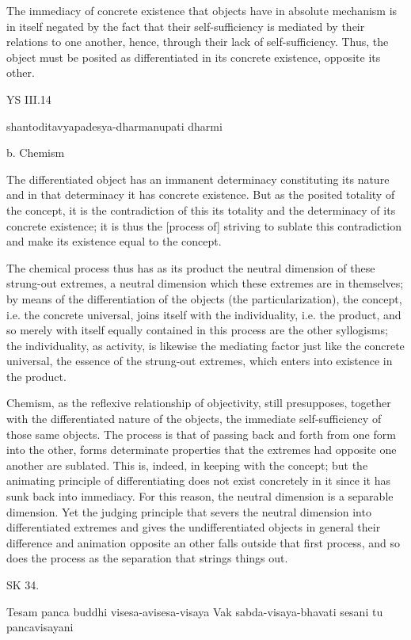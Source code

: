 The immediacy of concrete existence that objects have in absolute mechanism
is in itself negated by the fact that their self-sufficiency is mediated by
their relations to one another, hence, through their lack of self-sufficiency.
Thus, the object must be posited as differentiated in its concrete existence,
opposite its other.

YS III.14

shantoditavyapadesya-dharmanupati dharmi

b. Chemism

The differentiated object has an immanent determinacy constituting
its nature and in that determinacy it has concrete existence.
But as the posited totality of the concept, it is the contradiction of
this its totality and the determinacy of its concrete existence;
it is thus the [process of] striving to sublate this contradiction
and make its existence equal to the concept.

The chemical process thus has as its product the neutral dimension of
these strung-out extremes, a neutral dimension which these extremes are
in themselves; by means of the differentiation of the objects (the particularization),
the concept, i.e. the concrete universal, joins itself
with the individuality, i.e. the product, and so merely
with itself equally contained in this process are the other syllogisms;
the individuality, as activity, is likewise the mediating factor just like the concrete universal,
the essence of the strung-out extremes, which enters into existence in the product.

Chemism, as the reflexive relationship of objectivity, still presupposes,
together with the differentiated nature of the objects,
the immediate self-sufficiency of those same objects.
The process is that of passing back and forth from one form into the other,
forms determinate properties that the extremes had opposite one another are sublated.
This is, indeed, in keeping with the concept;
but the animating principle of differentiating does not exist
concretely in it since it has sunk back into immediacy.
For this reason, the neutral dimension is a separable dimension.
Yet the judging principle that severs the neutral dimension into
differentiated extremes and gives the undifferentiated objects in general
their difference and animation opposite an other falls outside that first process,
and so does the process as the separation that strings things out.

SK 34.

Tesam panca buddhi visesa-avisesa-visaya
Vak sabda-visaya-bhavati sesani tu pancavisayani

